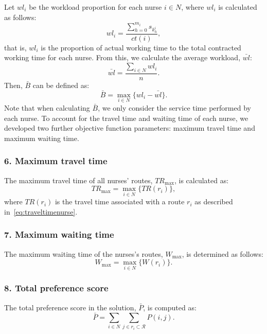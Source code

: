 \documentclass[a4paper,11pt,authoryear]{elsarticle}
\begin{document}
Let $wl_i$ be the workload proportion for each nurse $i \in N$, where $wl_i$ is calculated as follows:
\begin{equation}
	wl_i = \frac{\displaystyle\sum_{h=0}^{m_i} s_{k_h^i}}{ct(i)}, \label{eq:workloadnurse}
\end{equation}
that is, $wl_i$ is the proportion of actual working time to the total contracted working time for each nurse. From this, we calculate the average workload, $\bar{wl}$:
\begin{equation}
	\bar{wl} = \frac{\displaystyle\sum_{i \in N} wl_i}{n}. \label{eq:averageworkload}
\end{equation}
Then, $\bar{B}$ can be defined as:
\begin{equation}
	\bar{B} = \max_{i \in N} \{wl_i - \bar{wl}\}. \label{eq:workloadbalance}
\end{equation}
\noindent Note that when calculating $\bar{B}$, we only consider the service time performed by each nurse. To account for the travel time and waiting time of each nurse, we developed two further objective function parameters: maximum travel time and maximum waiting time.

\subsubsection*{6. Maximum travel time}
\noindent The maximum travel time of all nurses' routes, $TR_{\text{max}}$, is calculated as:
\begin{equation}
	TR_{\text{max}} = \max_{i \in N} \{TR(r_i)\}, \label{eq:maxtraveltime}
\end{equation}
where $TR(r_i)$ is the travel time associated with a route $r_i$ as described in~\eqref{eq:traveltimenurse}.

\subsubsection*{7. Maximum waiting time}
\noindent The maximum waiting time of the nurses's routes, $W_{\text{max}}$, is determined as follows: 
\begin{equation}
	W_{\text{max}} = \max_{i \in N} \{W(r_i)\}. \label{eq:maxwaitingtime}
\end{equation}

\subsubsection*{8. Total preference score}
\noindent The total preference score in the solution, $\bar{P}$, is computed as:
\begin{equation}
    \bar{P} = \sum_{i \in N} \sum_{j \in r_i \subset \mathcal{R}} P(i,j). \label{eq:totalpreference}
\end{equation}
\end{document}

